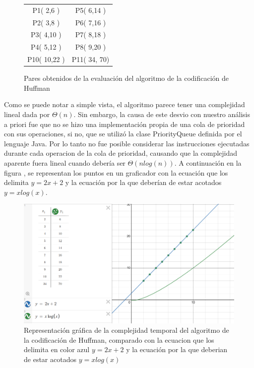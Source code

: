     \begin{figure}[h!]
        \centering
        \begin{tabular}{c|c}
            P1( 2,6 ) & P5( 6,14 )\\
            P2( 3,8 ) & P6( 7,16 )\\
            P3( 4,10 ) & P7( 8,18 )\\
            P4( 5,12 ) & P8( 9,20 )\\
            P10( 10,22 ) & P11( 34, 70)
        \end{tabular}
        \caption{Pares obtenidos de la evaluación del algoritmo de la codificación de Huffman}
        \label{PuntosHuffman}
    \end{figure}
    
    Como se puede notar a simple vista, el algoritmo parece tener una complejidad lineal dada por $\Theta(n)$. Sin embargo, la causa de este desvio con nuestro análisis a priori fue que no se hizo una implementación propia de una cola de prioridad con sus operaciones, si no, que se utilizó la clase PriorityQueue definida por el lenguaje Java. Por lo tanto no fue posible considerar las instrucciones ejecutadas durante cada operacion de la cola de prioridad, causando que la complejidad aparente fuera lineal cuando debería ser $\Theta(nlog(n))$. A continuación en la figura , se representan los puntos en un graficador con la ecuación que los delimita $y=2x+2$ y la ecuación por la que deberían de estar acotados $y=xlog(x)$.
    
    \begin{figure}[h!]
        \centering
        \includegraphics[width=13cm]{Huffman/graf-desm-huffman.png}
        \caption{Representación gráfica de la complejidad temporal del algoritmo de la codificación de Huffman, comparado con la ecuacion que los delimita en color azul $y=2x+2$ y la ecuación por la que deberian de estar acotados $y=xlog(x)$}
        \label{GraficaHuffman}
    \end{figure}
    \newpage
    
